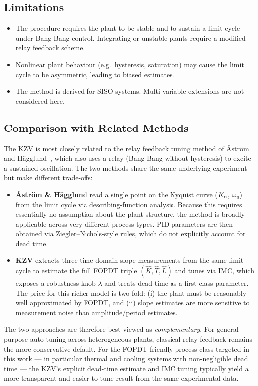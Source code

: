 \subsection{Limitations}
\label{sec:disc:limitations}

\begin{itemize}
    \item The procedure requires the plant to be stable and to sustain a
          limit cycle under Bang-Bang control.
          Integrating or unstable plants require a modified relay feedback
          scheme.
    \item Nonlinear plant behaviour (e.g.\ hysteresis, saturation) may cause
          the limit cycle to be asymmetric, leading to biased estimates.
    \item The method is derived for SISO systems. Multi-variable extensions
          are not considered here.
\end{itemize}

\subsection{Comparison with Related Methods}
\label{sec:disc:related}

The KZV is most closely related to the relay feedback tuning method of
\AA{}str\"om and H\"agglund~\cite{Astrom1984}, which also uses a relay
(Bang-Bang without hysteresis) to excite a sustained oscillation.
The two methods share the same underlying experiment but make different
trade-offs:

\begin{itemize}
    \item \textbf{\AA{}str\"om \& H\"agglund} read a single point on the
          Nyquist curve ($K_{\mathrm{u}}$, $\omega_u$) from the limit cycle via
          describing-function analysis. Because this requires essentially no
          assumption about the plant structure, the method is broadly
          applicable across very different process types. PID parameters are
          then obtained via Ziegler--Nichols-style rules, which do not
          explicitly account for dead time.
    \item \textbf{KZV} extracts three time-domain slope measurements from
          the same limit cycle to estimate the full FOPDT triple
          $(\hat{K}, \hat{T}, \hat{L})$ and tunes via IMC, which exposes a
          robustness knob $\lambda$ and treats dead time as a first-class
          parameter. The price for this richer model is two-fold: (i) the
          plant must be reasonably well approximated by FOPDT, and (ii)
          slope estimates are more sensitive to measurement noise than
          amplitude/period estimates.
\end{itemize}

The two approaches are therefore best viewed as \emph{complementary}.
For general-purpose auto-tuning across heterogeneous plants, classical
relay feedback remains the more conservative default. For the FOPDT-friendly
process class targeted in this work --- in particular thermal and cooling
systems with non-negligible dead time --- the KZV's explicit dead-time
estimate and IMC tuning typically yield a more transparent and easier-to-tune
result from the same experimental data.
